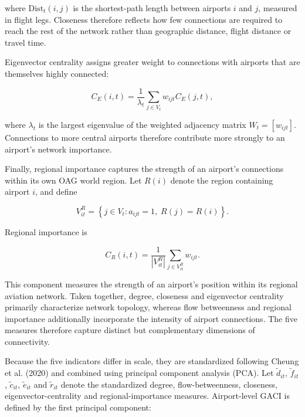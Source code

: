 \documentclass[12pt]{article}
\begin{document}
where $\mathrm{Dist}_t(i,j)$ is the shortest-path length between airports $i$ and $j$, measured in flight legs. Closeness therefore reflects how few connections are required to reach the rest of the network rather than geographic distance, flight distance or travel time.

Eigenvector centrality assigns greater weight to connections with airports that are themselves highly connected:

\begin{equation}
C_E(i,t)
=
\frac{1}{\lambda_t}
\sum_{j\in V_t}
w_{ijt} C_E(j,t),
\label{eq:nature_14}
\end{equation}

where $\lambda_t$ is the largest eigenvalue of the weighted adjacency matrix $W_t=[w_{ijt}]$. Connections to more central airports therefore contribute more strongly to an airport's network importance.

Finally, regional importance captures the strength of an airport's connections within its own OAG world region. Let $R(i)$ denote the region containing airport $i$, and define

\begin{equation}
V^R_{it}
=
\left\{
j\in V_t:
a_{ijt}=1,\;
R(j)=R(i)
\right\}.
\label{eq:nature_15}
\end{equation}

Regional importance is

\begin{equation}
C_R(i,t)
=
\frac{1}{|V^R_{it}|}
\sum_{j\in V^R_{it}}
w_{ijt}.
\label{eq:nature_16}
\end{equation}

This component measures the strength of an airport's position within its regional aviation network. Taken together, degree, closeness and eigenvector centrality primarily characterize network topology, whereas flow betweenness and regional importance additionally incorporate the intensity of airport connections. The five measures therefore capture distinct but complementary dimensions of connectivity.

Because the five indicators differ in scale, they are standardized following Cheung et al. (2020) and combined using principal component analysis (PCA). Let $\tilde d_{it}$, $\tilde f_{it}$, $\tilde c_{it}$, $\tilde e_{it}$ and $\tilde r_{it}$ denote the standardized degree, flow-betweenness, closeness, eigenvector-centrality and regional-importance measures. Airport-level GACI is defined by the first principal component:
\end{document}
